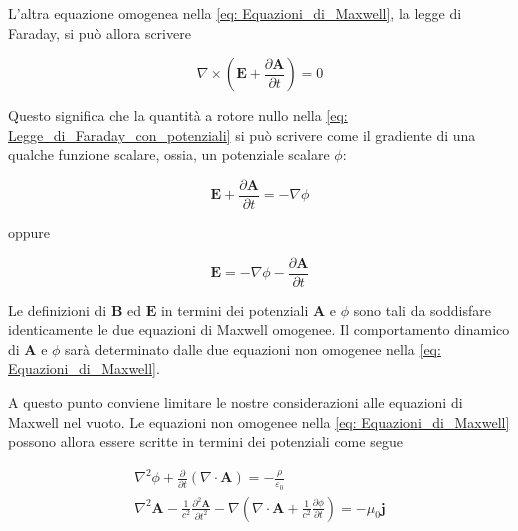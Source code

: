 L'altra equazione omogenea nella \ref{eq: Equazioni_di_Maxwell}, la legge di Faraday, si può allora scrivere 

\begin{equation} \label{eq: Legge_di_Faraday_con_potenziali}
    \nabla \times \left(\mathbf{E} + \frac{\partial \mathbf{A}}{\partial t} \right) = 0
\end{equation}

Questo significa che la quantità a rotore nullo nella \ref{eq: Legge_di_Faraday_con_potenziali} si può scrivere come il gradiente di una qualche funzione scalare, ossia, un potenziale scalare $\phi$:

\begin{equation}
    \mathbf{E} + \frac{\partial \mathbf{A}}{\partial t} = - \nabla \phi
\end{equation}

oppure 

\begin{tcolorbox}[colback=yellow!10!white, colframe=orange!70!black, boxrule=0.8pt]
\begin{equation}
    \mathbf{E} = - \nabla \phi - \frac{\partial \mathbf{A}}{\partial t}
\end{equation}
\end{tcolorbox}

Le definizioni di $\mathbf{B}$ ed $\mathbf{E}$ in termini dei potenziali $\mathbf{A}$ e $\phi$ sono tali da soddisfare identicamente le due equazioni di Maxwell omogenee. Il comportamento dinamico di $\mathbf{A}$ e $\phi$ sarà determinato dalle due equazioni non omogenee nella \ref{eq: Equazioni_di_Maxwell}. \\

\newpage

A questo punto conviene limitare le nostre considerazioni alle equazioni di Maxwell nel vuoto. Le equazioni non omogenee nella \ref{eq: Equazioni_di_Maxwell} possono allora essere scritte in termini dei potenziali come segue

\begin{tcolorbox}[colback=yellow!10!white, colframe=orange!70!black, boxrule=0.8pt]
\begin{align} \label{eq: Potenziali_prima_gauge}
    \nabla^2 \phi + \frac{\partial}{\partial t} (\nabla \cdot \mathbf{A}) = - \frac{\rho}{\varepsilon_0}\\
    \nabla^2 \mathbf{A} - \frac{1}{c^2} \frac{\partial^2 \mathbf{A}}{\partial t^2} - \nabla \left( \nabla \cdot \mathbf{A} + \frac{1}{c^2} \frac{\partial \phi}{\partial t} \right) = - \mu_0 \mathbf{j} 
\end{align} 
\end{tcolorbox}

